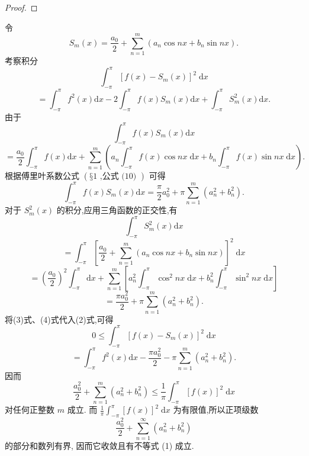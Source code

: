 \begin{proof}

\end{proof}
令
\[
{S}_{m}\left( x\right)  = \frac{{a}_{0}}{2} + \mathop{\sum }\limits_{{n = 1}}^{m}\left( {{a}_{n}\cos {nx} + {b}_{n}\sin {nx}}\right) .
\]
考察积分
\[
{\int }_{-\pi }^{\pi }{\left\lbrack  f\left( x\right)  - {S}_{m}\left( x\right) \right\rbrack  }^{2}\mathrm{\;d}x
\]
\[
= {\int }_{-\pi }^{\pi }{f}^{2}\left( x\right) \mathrm{d}x - 2{\int }_{-\pi }^{\pi }f\left( x\right) {S}_{m}\left( x\right) \mathrm{d}x + {\int }_{-\pi }^{\pi }{S}_{m}^{2}\left( x\right) \mathrm{d}x. \tag{2}
\]
由于
\[
{\int }_{-\pi }^{\pi }f\left( x\right) {S}_{m}\left( x\right) \mathrm{d}x
\]
\[
= \frac{{a}_{0}}{2}{\int }_{-\pi }^{\pi }f\left( x\right) \mathrm{d}x + \mathop{\sum }\limits_{{n = 1}}^{m}\left( {{a}_{n}{\int }_{-\pi }^{\pi }f\left( x\right) \cos {nx}\mathrm{\;d}x + {b}_{n}{\int }_{-\pi }^{\pi }f\left( x\right) \sin {nx}\mathrm{\;d}x}\right) .
\]
根据傅里叶系数公式 \(\left( {§1\text{ ,公式 (10) }}\right)\) 可得
\[
{\int }_{-\pi }^{\pi }f\left( x\right) {S}_{m}\left( x\right) \mathrm{d}x = \frac{\pi }{2}{a}_{0}^{2} + \pi \mathop{\sum }\limits_{{n = 1}}^{m}\left( {{a}_{n}^{2} + {b}_{n}^{2}}\right) . \tag{3}
\]
对于 \({S}_{m}^{2}\left( x\right)\) 的积分,应用三角函数的正交性,有
\[
{\int }_{-\pi }^{\pi }{S}_{m}^{2}\left( x\right) \mathrm{d}x
\]
\[
= {\int }_{-\pi }^{\pi }{\left\lbrack  \frac{{a}_{0}}{2} + \mathop{\sum }\limits_{{n = 1}}^{m}\left( {a}_{n}\cos nx + {b}_{n}\sin nx\right) \right\rbrack  }^{2}\mathrm{\;d}x
\]
\[
= {\left( \frac{{a}_{0}}{2}\right) }^{2}{\int }_{-\pi }^{\pi }\mathrm{d}x + \mathop{\sum }\limits_{{n = 1}}^{m}\left\lbrack  {{a}_{n}^{2}{\int }_{-\pi }^{\pi }{\cos }^{2}{nx}\mathrm{\;d}x + {b}_{n}^{2}{\int }_{-\pi }^{\pi }{\sin }^{2}{nx}\mathrm{\;d}x}\right\rbrack
\]
\[
= \frac{\pi {a}_{0}^{2}}{2} + \pi \mathop{\sum }\limits_{{n = 1}}^{m}\left( {{a}_{n}^{2} + {b}_{n}^{2}}\right) . \tag{4}
\]
将(3)式、(4)式代入(2)式,可得
\[
0 \leq  {\int }_{-\pi }^{\pi }{\left\lbrack  f\left( x\right)  - {S}_{m}\left( x\right) \right\rbrack  }^{2}\mathrm{\;d}x
\]
\[
= {\int }_{-\pi }^{\pi }{f}^{2}\left( x\right) \mathrm{d}x - \frac{\pi {a}_{0}^{2}}{2} - \pi \mathop{\sum }\limits_{{n = 1}}^{m}\left( {{a}_{n}^{2} + {b}_{n}^{2}}\right) .
\]
因而
\[
\frac{{a}_{0}^{2}}{2} + \mathop{\sum }\limits_{{n = 1}}^{m}\left( {{a}_{n}^{2} + {b}_{n}^{2}}\right)  \leq  \frac{1}{\pi }{\int }_{-\pi }^{\pi }{\left\lbrack  f\left( x\right) \right\rbrack  }^{2}\mathrm{\;d}x
\]
对任何正整数 \(m\) 成立. 而 \(\frac{1}{\pi }{\int }_{-\pi }^{\pi }{\left\lbrack  f\left( x\right) \right\rbrack  }^{2}\mathrm{\;d}x\) 为有限值,所以正项级数
\[
\frac{{a}_{0}^{2}}{2} + \mathop{\sum }\limits_{{n = 1}}^{\infty }\left( {{a}_{n}^{2} + {b}_{n}^{2}}\right)
\]
的部分和数列有界, 因而它收敛且有不等式 (1) 成立.

